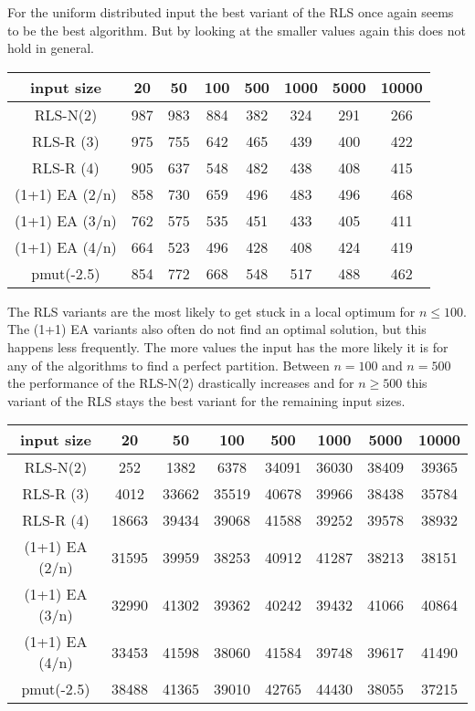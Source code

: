 For the uniform distributed input the best variant of the RLS once again seems to be the best algorithm.
But by looking at the smaller values again this does not hold in general.

\begin{tabular}[h]{cccccccc}
      input size     & 20  & 50  & 100 & 500 & 1000 & 5000 & 10000 \\\hline
      RLS-N(2)       & 987 & 983 & 884 & 382 & 324  & 291  & 266   \\
      RLS-R (3)      & 975 & 755 & 642 & 465 & 439  & 400  & 422   \\
      RLS-R (4)      & 905 & 637 & 548 & 482 & 438  & 408  & 415   \\
      (1+1) EA (2/n) & 858 & 730 & 659 & 496 & 483  & 496  & 468   \\
      (1+1) EA (3/n) & 762 & 575 & 535 & 451 & 433  & 405  & 411   \\
      (1+1) EA (4/n) & 664 & 523 & 496 & 428 & 408  & 424  & 419   \\
      pmut(-2.5)     & 854 & 772 & 668 & 548 & 517  & 488  & 462   \\
\end{tabular}

The RLS variants are the most likely to get stuck in a local optimum for $n\le100$. The (1+1) EA variants also often do not find an optimal solution, but this happens less frequently. The more values the input has the more likely it is for any of the algorithms to find a perfect partition. Between $n=100$ and $n=500$ the performance of the RLS-N(2) drastically increases and for $n\ge500$ this variant of the RLS stays the best variant for the remaining input sizes.

\begin{tabular}[h]{cccccccc}
      input size     & 20    & 50    & 100   & 500   & 1000  & 5000  & 10000 \\\hline
      RLS-N(2)       & 252   & 1382  & 6378  & 34091 & 36030 & 38409 & 39365 \\
      RLS-R (3)      & 4012  & 33662 & 35519 & 40678 & 39966 & 38438 & 35784 \\
      RLS-R (4)      & 18663 & 39434 & 39068 & 41588 & 39252 & 39578 & 38932 \\
      (1+1) EA (2/n) & 31595 & 39959 & 38253 & 40912 & 41287 & 38213 & 38151 \\
      (1+1) EA (3/n) & 32990 & 41302 & 39362 & 40242 & 39432 & 41066 & 40864 \\
      (1+1) EA (4/n) & 33453 & 41598 & 38060 & 41584 & 39748 & 39617 & 41490 \\
      pmut(-2.5)     & 38488 & 41365 & 39010 & 42765 & 44430 & 38055 & 37215 \\
\end{tabular}

